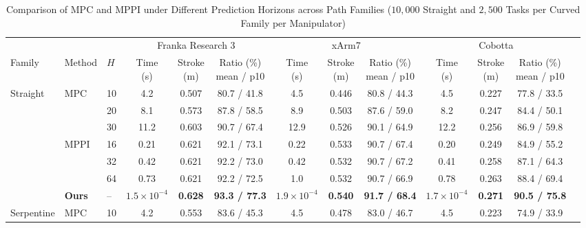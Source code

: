 \documentclass[journal, twoside]{IEEEtran}
\begin{document}
\begin{table}[!htbp]
\centering
\caption{Comparison of MPC and MPPI under Different Prediction Horizons across Path Families
($10{,}000$ Straight and $2{,}500$ Tasks per Curved Family per Manipulator)}
\label{tab:horizon}
\begin{threeparttable}
\footnotesize
\setlength{\tabcolsep}{3.2pt}
\begin{tabular}{lllcccccccccc}
\toprule
& & & \multicolumn{3}{c}{Franka Research 3}
& \multicolumn{3}{c}{xArm7}
& \multicolumn{3}{c}{Cobotta} \\
\cmidrule(lr){4-6} \cmidrule(lr){7-9} \cmidrule(lr){10-12}
Family
& Method
& $H$
& \shortstack{Time\\(s)} & \shortstack{Stroke\\(m)} & \shortstack{Ratio (\%)\\mean / p10}
& \shortstack{Time\\(s)} & \shortstack{Stroke\\(m)} & \shortstack{Ratio (\%)\\mean / p10}
& \shortstack{Time\\(s)} & \shortstack{Stroke\\(m)} & \shortstack{Ratio (\%)\\mean / p10} \\
\midrule
\multirow{7}{*}{Straight} & \multirow{3}{*}{MPC} & 10 & 4.2 & 0.507 & 80.7 / 41.8 & 4.5 & 0.446 & 80.8 / 44.3 & 4.5 & 0.227 & 77.8 / 33.5 \\
  &   & 20 & 8.1 & 0.573 & 87.8 / 58.5 & 8.9 & 0.503 & 87.6 / 59.0 & 8.2 & 0.247 & 84.4 / 50.1 \\
  &   & 30 & 11.2 & 0.603 & 90.7 / 67.4 & 12.9 & 0.526 & 90.1 / 64.9 & 12.2 & 0.256 & 86.9 / 59.8 \\
\cmidrule(lr){2-12}
  & \multirow{3}{*}{MPPI} & 16 & 0.21 & 0.621 & 92.1 / 73.1 & 0.22 & 0.533 & 90.7 / 67.4 & 0.20 & 0.249 & 84.9 / 55.2 \\
  &   & 32 & 0.42 & 0.621 & 92.2 / 73.0 & 0.42 & 0.532 & 90.7 / 67.2 & 0.41 & 0.258 & 87.1 / 64.3 \\
  &   & 64 & 0.73 & 0.621 & 92.2 / 72.5 & 1.0 & 0.532 & 90.7 / 66.9 & 0.78 & 0.263 & 88.4 / 69.4 \\
\cmidrule(lr){2-12}
 & \textbf{Ours} & -- & \textbf{$1.5\times10^{-4}$} & \textbf{0.628} & \textbf{93.3 / 77.3} & \textbf{$1.9\times10^{-4}$} & \textbf{0.540} & \textbf{91.7 / 68.4} & \textbf{$1.7\times10^{-4}$} & \textbf{0.271} & \textbf{90.5 / 75.8} \\
\midrule
\multirow{7}{*}{Serpentine} & \multirow{3}{*}{MPC} & 10 & 4.2 & 0.553 & 83.6 / 45.3 & 4.5 & 0.478 & 83.0 / 46.7 & 4.5 & 0.223 & 74.9 / 33.9 \\

\end{tabular}
\end{threeparttable}
\end{table}
\end{document}
